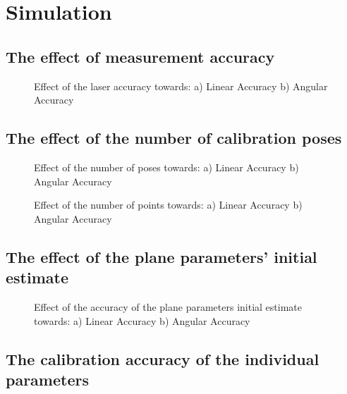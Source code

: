 \section{Simulation}
\label{sec:simulation}


\subsection{The effect of measurement accuracy}
\label{sec:meas_accuracy}

\begin{figure}[h]
  \centering
  \;
  \caption{Effect of the laser accuracy towards: a) Linear Accuracy b) Angular Accuracy} 
  \label{fig:num_of_poses}
\end{figure}





\subsection{The effect of the number of calibration poses}
\label{sec:calib_poses}

\begin{figure}[h]
  \centering
  \;
  \caption{Effect of the number of poses towards: a) Linear Accuracy b) Angular Accuracy} 
  \label{fig:num_of_poses}
\end{figure}

\begin{figure}[h]
  \centering
  \;
  \caption{Effect of the number of points towards: a) Linear Accuracy b) Angular Accuracy} 
  \label{fig:num_of_points}
\end{figure}





\subsection{The effect of the plane parameters' initial estimate}
\label{sec:plane_params}


\begin{figure}[h]
  \centering
  \;
  \caption{Effect of the accuracy of the plane parameters initial estimate towards: a) Linear Accuracy b) Angular Accuracy} 
  \label{fig:plane_params}
\end{figure}




\subsection{The calibration accuracy of the individual parameters}
\label{sec:individual_params}





